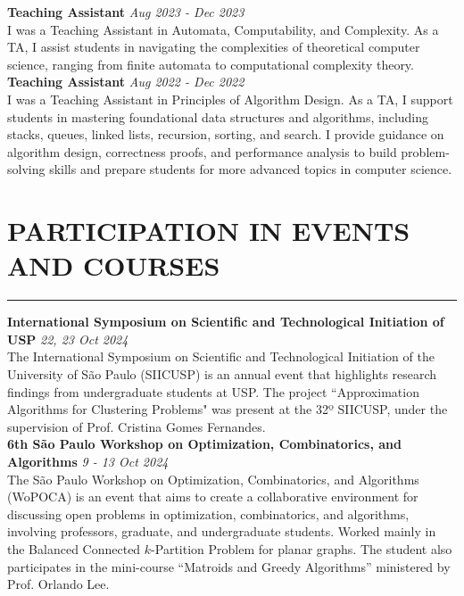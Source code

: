 \documentclass[a4paper,10pt]{article}
\begin{document}
\noindent\textbf{Teaching Assistant}  \hfill  \textit{Aug 2023 - Dec 2023}\\
I was a Teaching Assistant in Automata, Computability, and Complexity. As a TA, I assist students in navigating the complexities of theoretical computer science, ranging from finite automata to computational complexity theory. \\

\noindent\textbf{Teaching Assistant} \hfill  \textit{Aug 2022 - Dec 2022}\\
I was a Teaching Assistant in Principles of Algorithm Design. As a TA, I support students in mastering foundational data structures and algorithms, including stacks, queues, linked lists, recursion, sorting, and search. I provide guidance on algorithm design, correctness proofs, and performance analysis to build problem-solving skills and prepare students for more advanced topics in computer science.

\section*{PARTICIPATION IN EVENTS AND COURSES}
\vspace{-1.5em} %
\noindent\rule{\textwidth}{0.4pt} %

\noindent\textbf{International Symposium on Scientific and Technological Initiation of USP} \hfill \textit{22, 23 Oct 2024}\\
The International Symposium on Scientific and Technological Initiation of the University of São Paulo (SIICUSP) is an annual event that highlights research findings from undergraduate students at USP. The project ``Approximation Algorithms for Clustering Problems" was present at the 32º SIICUSP, under the supervision of Prof. Cristina Gomes Fernandes. \\

\noindent\textbf{6th São Paulo Workshop on Optimization, Combinatorics, and Algorithms} \hfill \textit{9 - 13 Oct 2024}\\
The São Paulo Workshop on Optimization, Combinatorics, and Algorithms (WoPOCA) is an event that aims to create a collaborative environment for discussing open problems in optimization, combinatorics, and algorithms, involving professors, graduate, and undergraduate students. Worked mainly in the Balanced Connected \(k\)-Partition Problem for planar graphs. The student also participates in the mini-course ``Matroids and Greedy Algorithms'' ministered by Prof. Orlando Lee. \\
\end{document}

